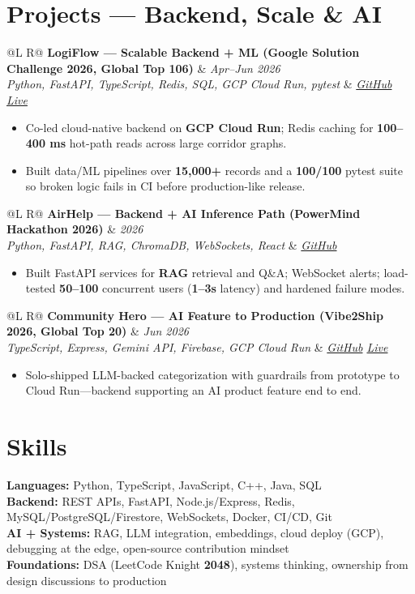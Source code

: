 \documentclass[a4paper,10pt]{article}
\makeatletter
\newcommand{\proj}[4]{%
  \vspace{1.5mm}
  \noindent\begin{tabularx}{\textwidth}{@{}L R@{}}
    \textbf{#1} & \textit{\small #2} \\
    \textit{\small #3} & \textit{\small #4} \\
  \end{tabularx}\par
  \vspace{0.5mm}%
}
\makeatother
\begin{document}
\section{Projects --- Backend, Scale \& AI}
\proj{LogiFlow --- Scalable Backend + ML (Google Solution Challenge 2026, Global Top 106)}{Apr--Jun 2026}
{Python, FastAPI, TypeScript, Redis, SQL, GCP Cloud Run, pytest}
{\href{https://github.com/Ojas-Srivastava05/LogiFlow-Solution-Challenge-2026}{GitHub} \textbar{} \href{https://logi-flow-solution-challenge-2026.vercel.app}{Live}}
\begin{itemize}
  \item Co-led cloud-native backend on \textbf{GCP Cloud Run}; Redis caching for \textbf{100--400 ms} hot-path reads across large corridor graphs.
  \item Built data/ML pipelines over \textbf{15,000+} records and a \textbf{100/100} pytest suite so broken logic fails in CI before production-like release.
\end{itemize}

\proj{AirHelp --- Backend + AI Inference Path (PowerMind Hackathon 2026)}{2026}
{Python, FastAPI, RAG, ChromaDB, WebSockets, React}
{\href{https://github.com/Ojas-Srivastava05/AirHelp-AI-Airport-Assistant}{GitHub}}
\begin{itemize}
  \item Built FastAPI services for \textbf{RAG} retrieval and Q\&A; WebSocket alerts; load-tested \textbf{50--100} concurrent users (\textbf{1--3s} latency) and hardened failure modes.
\end{itemize}

\proj{Community Hero --- AI Feature to Production (Vibe2Ship 2026, Global Top 20)}{Jun 2026}
{TypeScript, Express, Gemini API, Firebase, GCP Cloud Run}
{\href{https://github.com/Ojas-Srivastava05/community-hero}{GitHub} \textbar{} \href{https://community-hero-987477089222.asia-south1.run.app}{Live}}
\begin{itemize}
  \item Solo-shipped LLM-backed categorization with guardrails from prototype to Cloud Run---backend supporting an AI product feature end to end.
\end{itemize}

\section{Skills}
\noindent\small
\textbf{Languages:} Python, TypeScript, JavaScript, C++, Java, SQL \\[0.6mm]
\textbf{Backend:} REST APIs, FastAPI, Node.js/Express, Redis, MySQL/PostgreSQL/Firestore, WebSockets, Docker, CI/CD, Git \\[0.6mm]
\textbf{AI + Systems:} RAG, LLM integration, embeddings, cloud deploy (GCP), debugging at the edge, open-source contribution mindset \\[0.6mm]
\textbf{Foundations:} DSA (LeetCode Knight \textbf{2048}), systems thinking, ownership from design discussions to production
\end{document}
